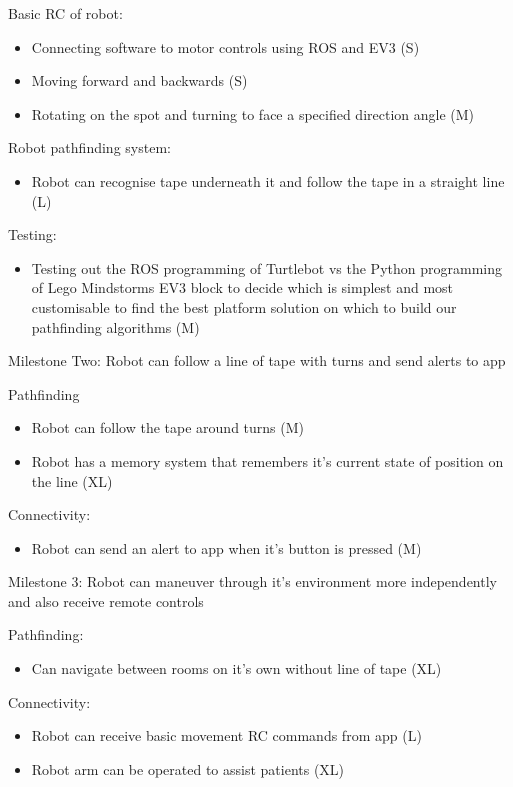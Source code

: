 \documentclass{article}
\begin{document}
Basic RC of robot:
\begin{itemize}
\item Connecting software to motor controls using ROS and EV3 (S)
\item Moving forward and backwards (S)
\item Rotating on the spot and turning to face a specified direction angle (M)
\end{itemize}
Robot pathfinding system:
\begin{itemize}
\item Robot can recognise tape underneath it and follow the tape in a straight line (L)
\end{itemize}
Testing:
\begin{itemize}
\item Testing out the ROS programming of Turtlebot vs the Python programming of Lego Mindstorms EV3 block to decide which is simplest and most customisable to find the best platform solution on which to build our pathfinding algorithms (M)
\end{itemize}

Milestone Two: Robot can follow a line of tape with turns and send alerts to app 

Pathfinding
\begin{itemize}
\item Robot can follow the tape around turns (M)
\item Robot has a memory system that remembers it's current state of position on the line (XL)
\end{itemize}
Connectivity:
\begin{itemize}
\item Robot can send an alert to app when it's button is pressed (M) 
\end{itemize}

Milestone 3: Robot can maneuver through it's environment more independently and also receive remote controls
    
Pathfinding:
\begin{itemize}
\item Can navigate between rooms on it's own without line of tape (XL)
\end{itemize}    
Connectivity:
\begin{itemize}
\item Robot can receive basic movement RC commands from app (L)
\item Robot arm can be operated to assist patients (XL)   
\end{itemize}
    
\end{document}
